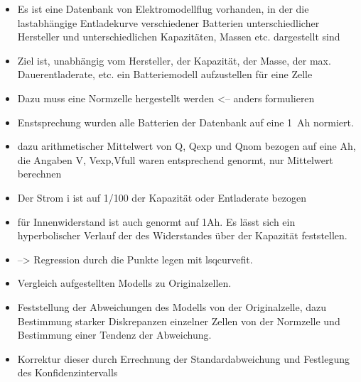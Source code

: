 \begin{itemize}
	\item Es ist eine Datenbank von Elektromodellflug vorhanden, in der die lastabhängige Entladekurve verschiedener Batterien unterschiedlicher Hersteller und unterschiedlichen Kapazitäten, Massen etc. dargestellt sind
	\item Ziel ist, unabhängig vom Hersteller, der Kapazität, der Masse, der max. Dauerentladerate, etc. ein Batteriemodell aufzustellen für eine Zelle
	\item Dazu muss eine Normzelle hergestellt werden <-- anders formulieren
	\item Enstsprechung wurden alle Batterien der Datenbank auf eine \SI{1}{Ah} normiert.
	\item dazu arithmetischer Mittelwert von Q, Qexp und Qnom bezogen auf eine Ah, die Angaben V, Vexp,Vfull waren entsprechend genormt, nur Mittelwert berechnen
	\item Der Strom i ist auf 1/100 der Kapazität oder Entladerate bezogen
	\item für Innenwiderstand ist auch genormt auf 1Ah. Es lässt sich ein hyperbolischer Verlauf der des Widerstandes über der Kapazität feststellen.
	\item --> Regression durch die Punkte legen mit lsqcurvefit. 
	\item Vergleich aufgestellten Modells zu Originalzellen. 
	\item Feststellung der Abweichungen des Modells von der Originalzelle, dazu Bestimmung starker Diskrepanzen einzelner Zellen von der Normzelle und Bestimmung einer Tendenz der Abweichung. 
	\item Korrektur dieser durch Errechnung der Standardabweichung und Festlegung des Konfidenzintervalls  
\end{itemize}


